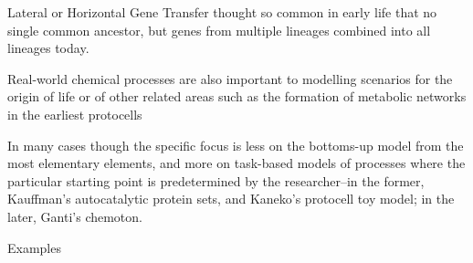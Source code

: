 Lateral or Horizontal Gene Transfer thought so common in early life that
no single common ancestor, but genes from multiple lineages combined
into all lineages today.\autocite{Ragan2009}

Real-world chemical processes are also important to modelling scenarios
for the origin of life or of other related areas such as the formation
of metabolic networks in the earliest protocells

In many cases though the specific focus is less on the bottoms-up model
from the most elementary elements, and more on task-based models of
processes where the particular starting point is predetermined by the
researcher--in the former, Kauffman's autocatalytic protein sets, and
Kaneko's protocell toy model; in the later, Ganti's chemoton.

Examples

